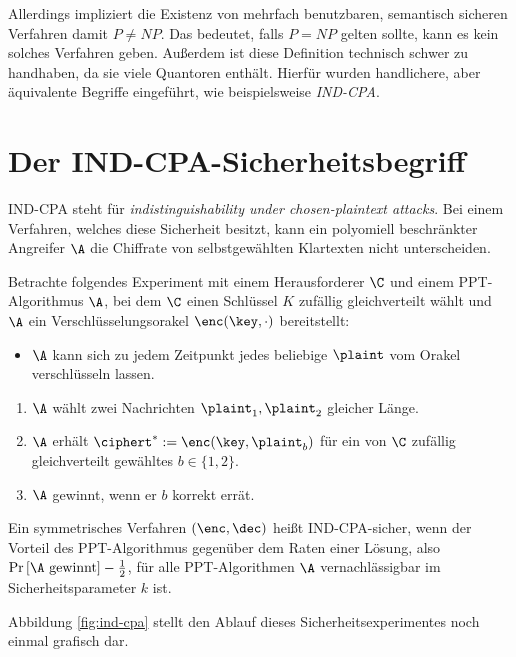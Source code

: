 Allerdings impliziert die Existenz von mehrfach benutzbaren, semantisch sicheren Verfahren damit $P \neq NP$. Das bedeutet, falls $P = NP$ gelten sollte, kann
es kein solches Verfahren geben. Außerdem ist diese Definition technisch schwer zu handhaben, da sie viele Quantoren enthält. Hierfür wurden handlichere, aber äquivalente Begriffe eingeführt, wie beispielsweise \emph{IND-CPA}.

\section{Der IND-CPA-Sicherheitsbegriff}\label{def:ind-cpa}
IND-CPA steht für \emph{indistinguishability under chosen-plaintext
  attacks}. Bei einem Verfahren, welches diese Sicherheit besitzt, kann
ein polyomiell beschränkter Angreifer $\A$ die Chiffrate von
selbstgewählten Klartexten nicht unterscheiden.
\begin{definition}
	Betrachte folgendes Experiment mit einem Herausforderer $\C$ und einem PPT-Algorithmus $\A$, bei dem $\C$ einen Schlüssel $K$ zufällig gleichverteilt wählt und $\A$ ein Verschlüsselungsorakel $\enc(\key,\cdot)$ bereitstellt: 
	\begin{itemize}
		\item $\A$ kann sich zu jedem Zeitpunkt jedes beliebige
                  $\plaint$ vom Orakel verschlüsseln lassen. 
	\end{itemize}
	\begin{enumerate}
		\item $\A$ wählt zwei Nachrichten $\plaint_1, \plaint_2$ gleicher Länge. 
		\item $\A$ erhält $\ciphert^{*} := \enc(\key,
                  \plaint_{b})$ für ein von $\C$ zufällig gleichverteilt
                  gewähltes $b \in \{1, 2\}$. 
		\item $\A$ gewinnt, wenn er $b$ korrekt errät.
	\end{enumerate}
	Ein symmetrisches Verfahren $(\enc, \dec)$ heißt IND-CPA-sicher, wenn der Vorteil des
        PPT-Algorithmus gegenüber dem Raten einer Lösung, also $\Pr
        \left[ \A \textnormal{ gewinnt} \right] - \frac{1}{2}$, für alle
        PPT-Algorithmen $\A$ vernachlässigbar im Sicherheitsparameter $k$  ist. 
\end{definition}
Abbildung \ref{fig:ind-cpa} stellt den Ablauf dieses
Sicherheitsexperimentes noch einmal grafisch dar.

